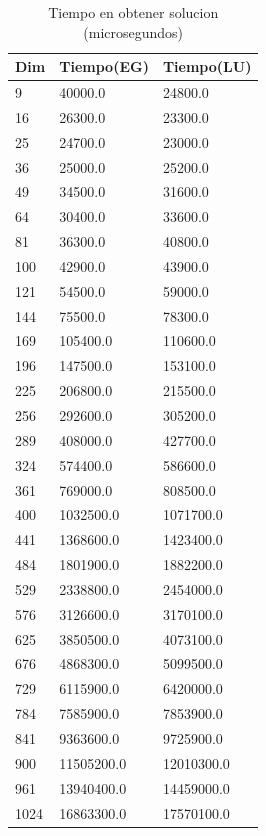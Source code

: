 \begin{table}[]
\centering
\caption{Tiempo en obtener solucion (microsegundos)}
\label{tabla-eg-lu}
\begin{tabular}{lll}
\hline
Dim  & Tiempo(EG) & Tiempo(LU) \\ \hline
9    & 40000.0    & 24800.0    \\
16   & 26300.0    & 23300.0    \\
25   & 24700.0    & 23000.0    \\
36   & 25000.0    & 25200.0    \\
49   & 34500.0    & 31600.0    \\
64   & 30400.0    & 33600.0    \\
81   & 36300.0    & 40800.0    \\
100  & 42900.0    & 43900.0    \\
121  & 54500.0    & 59000.0    \\
144  & 75500.0    & 78300.0    \\
169  & 105400.0   & 110600.0   \\
196  & 147500.0   & 153100.0   \\
225  & 206800.0   & 215500.0   \\
256  & 292600.0   & 305200.0   \\
289  & 408000.0   & 427700.0   \\
324  & 574400.0   & 586600.0   \\
361  & 769000.0   & 808500.0   \\
400  & 1032500.0  & 1071700.0  \\
441  & 1368600.0  & 1423400.0  \\
484  & 1801900.0  & 1882200.0  \\
529  & 2338800.0  & 2454000.0  \\
576  & 3126600.0  & 3170100.0  \\
625  & 3850500.0  & 4073100.0  \\
676  & 4868300.0  & 5099500.0  \\
729  & 6115900.0  & 6420000.0  \\
784  & 7585900.0  & 7853900.0  \\
841  & 9363600.0  & 9725900.0  \\
900  & 11505200.0 & 12010300.0 \\
961  & 13940400.0 & 14459000.0 \\
1024 & 16863300.0 & 17570100.0 \\ \hline
\end{tabular}
\end{table}

